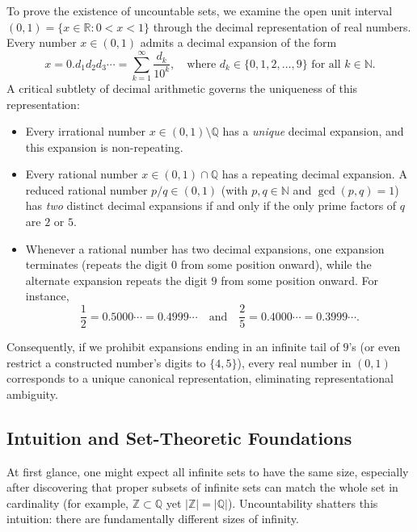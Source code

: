 \documentclass[11pt, letterpaper]{article}
\theoremstyle{definition}
\theoremstyle{remark}
\begin{document}
To prove the existence of uncountable sets, we examine the open unit interval $(0, 1) = \{x \in \mathbb{R} : 0 < x < 1\}$ through the decimal representation of real numbers. Every number $x \in (0, 1)$ admits a decimal expansion of the form
\[
x = 0.d_1 d_2 d_3 \cdots = \sum_{k=1}^{\infty} \frac{d_k}{10^k}, \quad \text{where } d_k \in \{0, 1, 2, \dots, 9\} \text{ for all } k \in \mathbb{N}.
\]
A critical subtlety of decimal arithmetic governs the uniqueness of this representation:
\begin{itemize}
    \item Every irrational number $x \in (0, 1) \setminus \mathbb{Q}$ has a \emph{unique} decimal expansion, and this expansion is non-repeating.
    \item Every rational number $x \in (0, 1) \cap \mathbb{Q}$ has a repeating decimal expansion. A reduced rational number $p/q \in (0, 1)$ (with $p, q \in \mathbb{N}$ and $\gcd(p, q) = 1$) has \emph{two} distinct decimal expansions if and only if the only prime factors of $q$ are $2$ or $5$.
    \item Whenever a rational number has two decimal expansions, one expansion terminates (repeats the digit $0$ from some position onward), while the alternate expansion repeats the digit $9$ from some position onward. For instance,
    \[
    \frac{1}{2} = 0.5000\cdots = 0.4999\cdots \quad \text{and} \quad \frac{2}{5} = 0.4000\cdots = 0.3999\cdots.
    \]
\end{itemize}
Consequently, if we prohibit expansions ending in an infinite tail of $9$'s (or even restrict a constructed number's digits to $\{4, 5\}$), every real number in $(0, 1)$ corresponds to a unique canonical representation, eliminating representational ambiguity.

\subsection{Intuition and Set-Theoretic Foundations}

At first glance, one might expect all infinite sets to have the same size, especially after discovering that proper subsets of infinite sets can match the whole set in cardinality (for example, $\mathbb{Z} \subset \mathbb{Q}$ yet $|\mathbb{Z}| = |\mathbb{Q}|$). Uncountability shatters this intuition: there are fundamentally different sizes of infinity.
\end{document}
